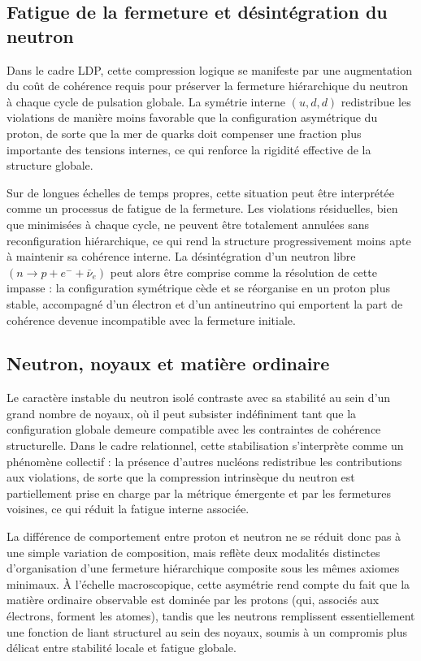 \documentclass[11pt,a4paper]{article}
\begin{document}
\subsection{Fatigue de la fermeture et désintégration du neutron}

Dans le cadre LDP, cette compression logique se manifeste par une augmentation du coût de cohérence requis pour préserver la fermeture hiérarchique du neutron à chaque cycle de pulsation globale. La symétrie interne \(\left(u,d,d\right)\) redistribue les violations de manière moins favorable que la configuration asymétrique du proton, de sorte que la mer de quarks doit compenser une fraction plus importante des tensions internes, ce qui renforce la rigidité effective de la structure globale. 

Sur de longues échelles de temps propres, cette situation peut être interprétée comme un processus de fatigue de la fermeture. Les violations résiduelles, bien que minimisées à chaque cycle, ne peuvent être totalement annulées sans reconfiguration hiérarchique, ce qui rend la structure progressivement moins apte à maintenir sa cohérence interne. La désintégration d’un neutron libre \(\left(n \rightarrow p + e^{-} + \bar{\nu}_e\right)\) peut alors être comprise comme la résolution de cette impasse : la configuration symétrique cède et se réorganise en un proton plus stable, accompagné d’un électron et d’un antineutrino qui emportent la part de cohérence devenue incompatible avec la fermeture initiale.

\subsection{Neutron, noyaux et matière ordinaire}

Le caractère instable du neutron isolé contraste avec sa stabilité au sein d’un grand nombre de noyaux, où il peut subsister indéfiniment tant que la configuration globale demeure compatible avec les contraintes de cohérence structurelle. Dans le cadre relationnel, cette stabilisation s’interprète comme un phénomène collectif : la présence d’autres nucléons redistribue les contributions aux violations, de sorte que la compression intrinsèque du neutron est partiellement prise en charge par la métrique émergente et par les fermetures voisines, ce qui réduit la fatigue interne associée.

La différence de comportement entre proton et neutron ne se réduit donc pas à une simple variation de composition, mais reflète deux modalités distinctes d’organisation d’une fermeture hiérarchique composite sous les mêmes axiomes minimaux. À l’échelle macroscopique, cette asymétrie rend compte du fait que la matière ordinaire observable est dominée par les protons (qui, associés aux électrons, forment les atomes), tandis que les neutrons remplissent essentiellement une fonction de liant structurel au sein des noyaux, soumis à un compromis plus délicat entre stabilité locale et fatigue globale.
\end{document}
